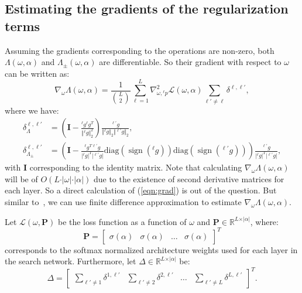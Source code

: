 \documentclass{article} \usepackage{fancyhdr, iclr2023_conference, times}
\def\mI{{\bm{I}}}
\def\mP{{\bm{P}}}
\DeclareMathOperator{\sign}{sign}
\begin{document}
\subsection{Estimating the gradients of the regularization terms}
Assuming the gradients corresponding to the operations are non-zero, both $\Lambda(\omega, \alpha)$ and $\Lambda_{\pm}(\omega, \alpha)$ are differentiable. So their gradient with respect to $\omega$ can be written as:
\begin{equation}
\label{eqn:grad}
    \nabla_\omega \Lambda(\omega, \alpha)=\frac{1}{\binom{L}{2}}\sum_{\ell=1}^L\nabla_{\omega, {}^\ell p}^2\mathcal{L}(\omega, \alpha) \sum_{\ell'\neq\ell} \delta^{\ell, \ell'},
\end{equation}
where we have:
\begin{equation}
\begin{aligned}
    \delta_{\Lambda}^{\ell, \ell'}&=\left(\mI-\frac{{}^\ell g{}^\ell g^T}{\Vert{}^\ell g\Vert_2^2}\right)\frac{{}^{\ell'} g}{\Vert{}^\ell g \Vert_2 \Vert {}^{\ell'} g \Vert_2},\\
    \delta_{\Lambda_\pm}^{\ell, \ell'}&=\left(\mI-\frac{{}^\ell g^T{}^{\ell'}g}{\vert{}^\ell g\vert^T\vert{}^{\ell'}g\vert}\text{diag}(\sign({}^\ell g)) \text{diag}(\sign({}^{\ell'}g))\right)\frac{{}^{\ell'}g}{\vert{}^\ell g \vert^T \vert{}^{\ell'}g\vert},
\end{aligned}
\end{equation}
with $\mI$ corresponding to the identity matrix. Note that calculating $\nabla_\omega \Lambda(\omega, \alpha)$ will be of $O(L\cdot \vert \omega\vert \cdot \vert \alpha\vert)$ due to the existence of second derivative matrices for each layer. So a direct calculation of (\ref{eqn:grad}) is out of the question. But similar to~\citep{DBLP:conf/iclr/LiuSY19}, we can use finite difference approximation to estimate $\nabla_\omega \Lambda(\omega, \alpha)$.
\par Let $\mathcal{L}(\omega, \mP)$ be the loss function as a function of $\omega$ and $\mP\in \mathbb{R}^{L\times \vert \alpha\vert}$, where:
\begin{equation}
    \mP=\begin{bmatrix}\sigma(\alpha)&\sigma(\alpha)&\dots & \sigma(\alpha)\end{bmatrix}^T
\end{equation}
corresponds to the softmax normalized architecture weights used for each layer in the search network. Furthermore, let $\Delta\in \mathbb{R}^{L\times \vert \alpha \vert}$ be:
\begin{equation}
    \Delta=\begin{bmatrix}\sum_{\ell'\neq1} \delta^{1, \ell'}&\sum_{\ell'\neq2} \delta^{2, \ell'}&\dots & \sum_{\ell'\neq L} \delta^{L, \ell'}\end{bmatrix}^T.
\end{equation}
\end{document}
